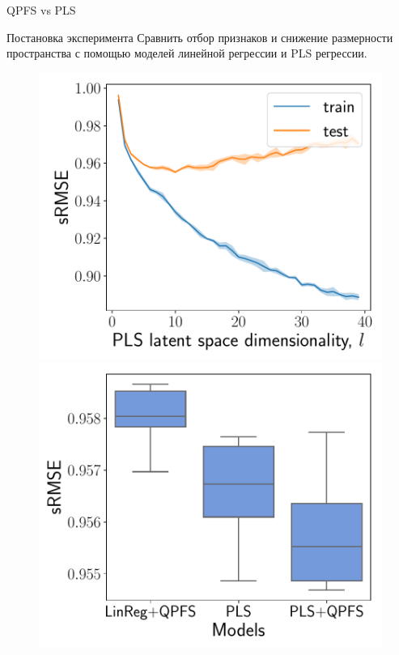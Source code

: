 \documentclass[9pt]{beamer}
\begin{document}
\begin{frame}{QPFS vs PLS}

\begin{block}{Постановка эксперимента}
	 	Сравнить отбор признаков и снижение размерности пространства с помощью моделей линейной регрессии и PLS регрессии.
\end{block}

\begin{figure}[h]
	\begin{minipage}{.5\linewidth}
		\centering
		\includegraphics[width=1.\linewidth]{figs/pls_vs_k}
	\end{minipage}%
	\begin{minipage}{.5\linewidth}
		\centering
		\includegraphics[width=1.\linewidth]{figs/models}
	\end{minipage}
\end{figure}

\end{frame}
\end{document}
